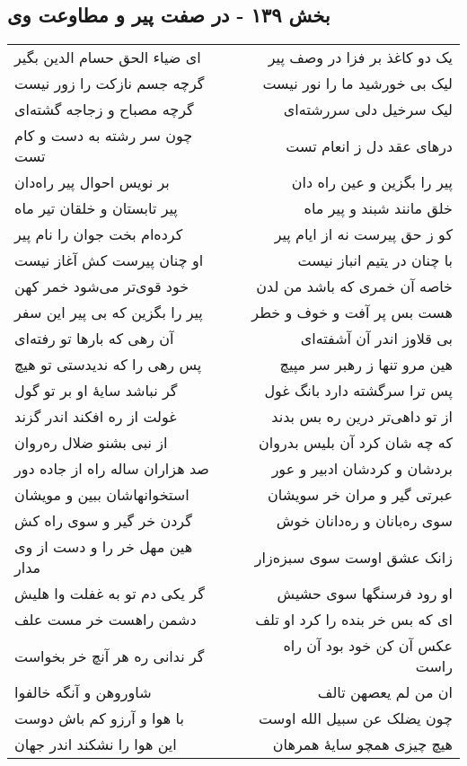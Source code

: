\begin{center}
\section*{بخش ۱۳۹ - در صفت پیر و مطاوعت وی}
\label{sec:sh139}
\begin{longtable}{l p{0.5cm} r}
ای ضیاء الحق حسام الدین بگیر
&&
یک دو کاغذ بر فزا در وصف پیر
\\
گرچه جسم نازکت را زور نیست
&&
لیک بی خورشید ما را نور نیست
\\
گرچه مصباح و زجاجه گشته‌ای
&&
لیک سرخیل دلی سررشته‌ای
\\
چون سر رشته به دست و کام تست
&&
درهای عقد دل ز انعام تست
\\
بر نویس احوال پیر راه‌دان
&&
پیر را بگزین و عین راه دان
\\
پیر تابستان و خلقان تیر ماه
&&
خلق مانند شبند و پیر ماه
\\
کرده‌ام بخت جوان را نام پیر
&&
کو ز حق پیرست نه از ایام پیر
\\
او چنان پیرست کش آغاز نیست
&&
با چنان در یتیم انباز نیست
\\
خود قوی‌تر می‌شود خمر کهن
&&
خاصه آن خمری که باشد من لدن
\\
پیر را بگزین که بی پیر این سفر
&&
هست بس پر آفت و خوف و خطر
\\
آن رهی که بارها تو رفته‌ای
&&
بی قلاوز اندر آن آشفته‌ای
\\
پس رهی را که ندیدستی تو هیچ
&&
هین مرو تنها ز رهبر سر مپیچ
\\
گر نباشد سایهٔ او بر تو گول
&&
پس ترا سرگشته دارد بانگ غول
\\
غولت از ره افکند اندر گزند
&&
از تو داهی‌تر درین ره بس بدند
\\
از نبی بشنو ضلال ره‌روان
&&
که چه شان کرد آن بلیس بدروان
\\
صد هزاران ساله راه از جاده دور
&&
بردشان و کردشان ادبیر و عور
\\
استخوانهاشان ببین و مویشان
&&
عبرتی گیر و مران خر سویشان
\\
گردن خر گیر و سوی راه کش
&&
سوی ره‌بانان و ره‌دانان خوش
\\
هین مهل خر را و دست از وی مدار
&&
زانک عشق اوست سوی سبزه‌زار
\\
گر یکی دم تو به غفلت وا هلیش
&&
او رود فرسنگها سوی حشیش
\\
دشمن راهست خر مست علف
&&
ای که بس خر بنده را کرد او تلف
\\
گر ندانی ره هر آنچ خر بخواست
&&
عکس آن کن خود بود آن راه راست
\\
شاوروهن و آنگه خالفوا
&&
ان من لم یعصهن تالف
\\
با هوا و آرزو کم باش دوست
&&
چون یضلک عن سبیل الله اوست
\\
این هوا را نشکند اندر جهان
&&
هیچ چیزی همچو سایهٔ همرهان
\\
\end{longtable}
\end{center}
